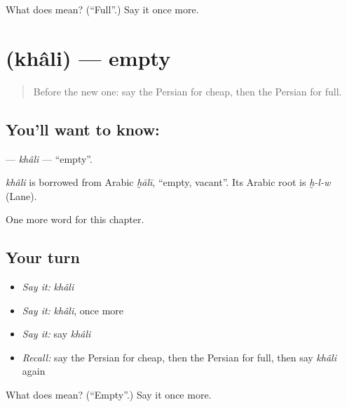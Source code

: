 \begin{tcolorbox}[breakable,colback=teal!4,colframe=teal!35!black,title={Before you move on}]
What does  mean? (\textquotedblleft{}Full\textquotedblright{}.) Say it once more.
\end{tcolorbox}
\section[\texorpdfstring{\fa{خالی} (khâli)}{خالی (khâli)}]{ (khâli) — empty}

\label{lesson:FA-C61-khali}



\begin{quote}
Before the new one: say the Persian for cheap, then the Persian for full.
\end{quote}

\subsection*{You'll want to know: }
\textbf{} — \emph{khâli} — \textquotedblleft{}empty\textquotedblright{}.

\begin{cousinweb}
\emph{khâli} is borrowed from Arabic \emph{ḫālī}, \textquotedblleft{}empty, vacant\textquotedblright{}. Its Arabic root is \emph{ḫ-l-w} (Lane).
\end{cousinweb}

\begin{grammarlens}[title={What you've built}]
One more word for this chapter.
\end{grammarlens}

\subsection*{Your turn}
\begin{itemize}
\raggedright
  \item \emph{Say it:} \emph{khâli}
  \item \emph{Say it:} \emph{khâli}, once more
  \item \emph{Say it:} say \emph{khâli}
  \item \emph{Recall:} say the Persian for cheap, then the Persian for full, then say \emph{khâli} again
\end{itemize}

\begin{tcolorbox}[breakable,colback=teal!4,colframe=teal!35!black,title={Before you move on}]
What does  mean? (\textquotedblleft{}Empty\textquotedblright{}.) Say it once more.
\end{tcolorbox}
